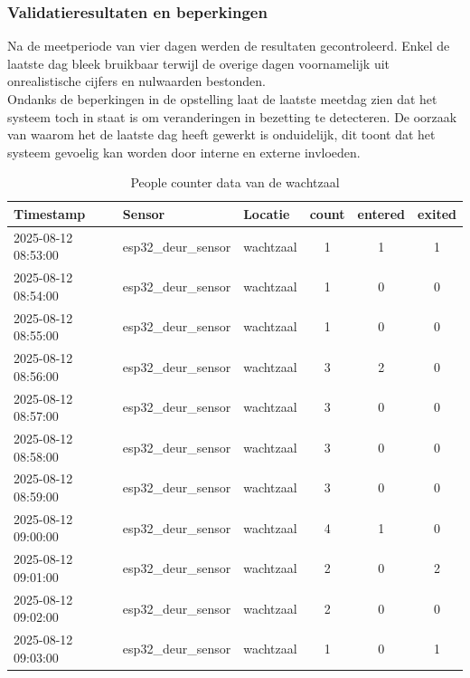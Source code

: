 \subsubsection{Validatieresultaten en beperkingen}
Na de meetperiode van vier dagen werden de resultaten gecontroleerd. Enkel de laatste dag bleek bruikbaar terwijl de overige dagen voornamelijk uit onrealistische cijfers en nulwaarden bestonden. \\

Ondanks de beperkingen in de opstelling laat de laatste meetdag zien dat het systeem toch in staat is om veranderingen in bezetting te detecteren. De oorzaak van waarom het de laatste dag heeft gewerkt is onduidelijk, dit toont dat het systeem gevoelig kan worden door interne en externe invloeden.

\begin{table}[h!]
    \centering
    \begin{tabular}{|l|l|l|c|c|c|}
        \hline
        \textbf{Timestamp}  & \textbf{Sensor} & \textbf{Locatie} & \textbf{count} & \textbf{entered} & \textbf{exited} \\ \hline
        2025-08-12 08:53:00 & esp32\_deur\_sensor & wachtzaal & 1 & 1 & 1 \\ \hline
        2025-08-12 08:54:00 & esp32\_deur\_sensor & wachtzaal & 1 & 0 & 0 \\ \hline
        2025-08-12 08:55:00 & esp32\_deur\_sensor & wachtzaal & 1 & 0 & 0 \\ \hline
        2025-08-12 08:56:00 & esp32\_deur\_sensor & wachtzaal & 3 & 2 & 0 \\ \hline
        2025-08-12 08:57:00 & esp32\_deur\_sensor & wachtzaal & 3 & 0 & 0 \\ \hline
        2025-08-12 08:58:00 & esp32\_deur\_sensor & wachtzaal & 3 & 0 & 0 \\ \hline
        2025-08-12 08:59:00 & esp32\_deur\_sensor & wachtzaal & 3 & 0 & 0 \\ \hline
        2025-08-12 09:00:00 & esp32\_deur\_sensor & wachtzaal & 4 & 1 & 0 \\ \hline
        2025-08-12 09:01:00 & esp32\_deur\_sensor & wachtzaal & 2 & 0 & 2 \\ \hline
        2025-08-12 09:02:00 & esp32\_deur\_sensor & wachtzaal & 2 & 0 & 0 \\ \hline
        2025-08-12 09:03:00 & esp32\_deur\_sensor & wachtzaal & 1 & 0 & 1 \\ \hline
    \end{tabular}
    \caption{People counter data van de wachtzaal}
    \label{tab:people_counter}
\end{table}


